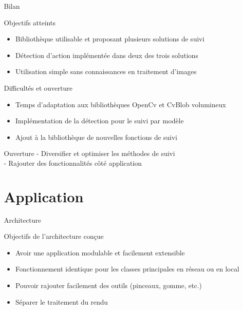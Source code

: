 \documentclass{beamer}
\begin{document}
            \begin{frame}{Bilan}
                  \begin{exampleblock}{Objectifs atteints}
                        \begin{itemize}
                        \item Bibliothèque utilisable et proposant plusieurs solutions de suivi
                        \item Détection d'action implémentée dans deux des trois solutions
                        \item Utilisation simple sans connaissances en traitement d'images
                        \end{itemize}
                  \end{exampleblock}
                  \pause
                  \begin{alertblock}{Difficultés et ouverture}
                        \begin{itemize}
                        \item Temps d'adaptation aux bibliothèques OpenCv et CvBlob volumineux
                        \item Implémentation de la détection pour le suivi par modèle
                        \item Ajout à la bibliothèque de nouvelles fonctions de suivi
                        \end{itemize}
                  \end{alertblock}
				  
                  \begin{block}{Ouverture}
                        - Diversifier et optimiser les méthodes de suivi \\
                        - Rajouter des fonctionnalités côté application \\
                  \end{block}				  
            \end{frame}
      
      \section{Application}
            \begin{frame}{Architecture}
                  \begin{block}{Objectifs de l'architecture conçue}
                        \begin{itemize}
                        \item{Avoir une application modulable et facilement extensible}
                        \item{Fonctionnement identique pour les classes principales en réseau ou en local}
                        \item{Pouvoir rajouter facilement des outils (pinceaux, gomme, etc.)}
                        \item{Séparer le traitement du rendu}
                        \end{itemize}
                  \end{block}
            \end{frame}
            
\end{document}
